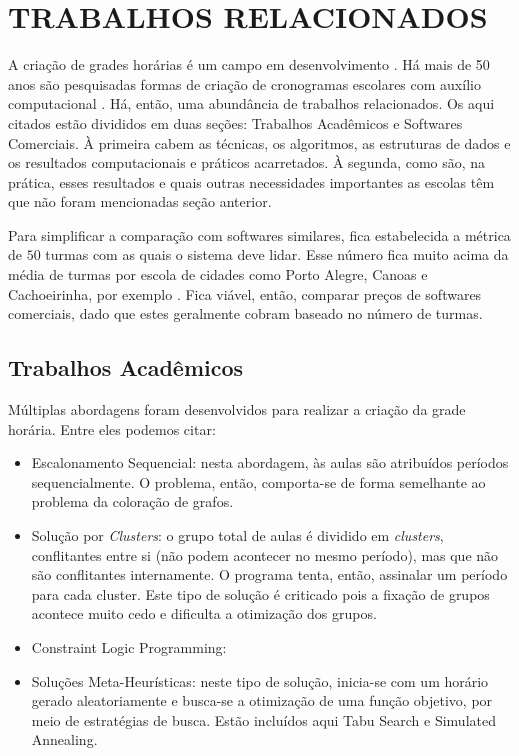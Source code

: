 \documentclass[12pt,a4paper]{article}
\begin{document}
	\section{TRABALHOS RELACIONADOS}

		\par A criação de grades horárias é um campo em desenvolvimento \cite{patat2020}. Há mais de 50 anos são pesquisadas formas de criação de cronogramas escolares com auxílio computacional \cite{appleby}. Há, então, uma abundância de trabalhos relacionados. Os aqui citados estão divididos em duas seções: Trabalhos Acadêmicos e Softwares Comerciais. À primeira cabem as técnicas, os algoritmos, as estruturas de dados e os resultados computacionais e práticos acarretados. À segunda, como são, na prática, esses resultados e quais outras necessidades importantes as escolas têm que não foram mencionadas seção anterior.

		\par Para simplificar a comparação com softwares similares, fica estabelecida a métrica de $50$ turmas com as quais o sistema deve lidar. Esse número fica muito acima da média de turmas por escola de cidades como Porto Alegre, Canoas e Cachoeirinha, por exemplo \cite{inep}. Fica viável, então, comparar preços de softwares comerciais, dado que estes geralmente cobram baseado no número de turmas.


		\subsection{Trabalhos Acadêmicos}

			\par Múltiplas abordagens foram desenvolvidos para realizar a criação da grade horária. Entre eles podemos citar:

			\begin{itemize}
				\item Escalonamento Sequencial: nesta abordagem, às aulas são atribuídos períodos sequencialmente. O problema, então, comporta-se de forma semelhante ao problema da coloração de grafos.
				\item Solução por \textit{Clusters}: o grupo total de aulas é dividido em \textit{clusters}, conflitantes entre si (não podem acontecer no mesmo período), mas que não são conflitantes internamente. O programa tenta, então, assinalar um período para cada cluster. Este tipo de solução é criticado pois a fixação de grupos acontece muito cedo e dificulta a otimização dos grupos. \cite{muller}
				\item Constraint Logic Programming:
				\item Soluções Meta-Heurísticas: neste tipo de solução, inicia-se com um horário gerado aleatoriamente e busca-se a otimização de uma função objetivo, por meio de estratégias de busca. Estão incluídos aqui Tabu Search e Simulated Annealing.
			\end{itemize}
\end{document}

